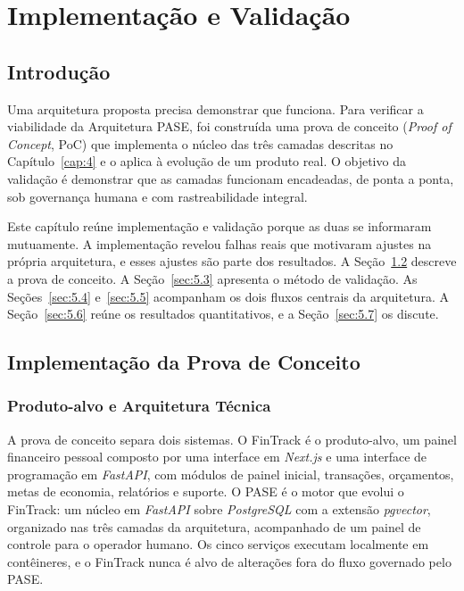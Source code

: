 
\chapter{Implementação e Validação}\label{cap:5}

\section{Introdução}\label{sec:5.1}

Uma arquitetura proposta precisa demonstrar que funciona. Para verificar a viabilidade da Arquitetura PASE, foi construída uma prova de conceito (\textit{Proof of Concept}, PoC) que implementa o núcleo das três camadas descritas no Capítulo~\ref{cap:4} e o aplica à evolução de um produto real. O objetivo da validação é demonstrar que as camadas funcionam encadeadas, de ponta a ponta, sob governança humana e com rastreabilidade integral.

Este capítulo reúne implementação e validação porque as duas se informaram mutuamente. A implementação revelou falhas reais que motivaram ajustes na própria arquitetura, e esses ajustes são parte dos resultados. A Seção~\ref{sec:5.2} descreve a prova de conceito. A Seção~\ref{sec:5.3} apresenta o método de validação. As Seções~\ref{sec:5.4} e~\ref{sec:5.5} acompanham os dois fluxos centrais da arquitetura. A Seção~\ref{sec:5.6} reúne os resultados quantitativos, e a Seção~\ref{sec:5.7} os discute.

\section{Implementação da Prova de Conceito}\label{sec:5.2}

\subsection{Produto-alvo e Arquitetura Técnica}\label{sec:5.2.1}

A prova de conceito separa dois sistemas. O FinTrack é o produto-alvo, um painel financeiro pessoal composto por uma interface em \textit{Next.js} e uma interface de programação em \textit{FastAPI}, com módulos de painel inicial, transações, orçamentos, metas de economia, relatórios e suporte. O PASE é o motor que evolui o FinTrack: um núcleo em \textit{FastAPI} sobre \textit{PostgreSQL} com a extensão \textit{pgvector}, organizado nas três camadas da arquitetura, acompanhado de um painel de controle para o operador humano. Os cinco serviços executam localmente em contêineres, e o FinTrack nunca é alvo de alterações fora do fluxo governado pelo PASE.

